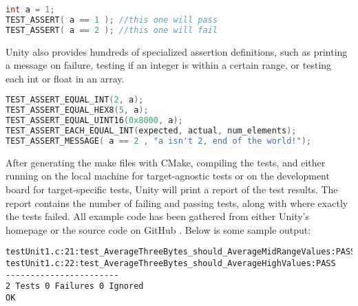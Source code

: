 \begin{lstlisting}[language=C, caption=Unity Basic Assertion Example
\cite{unity-homepage}]
int a = 1;
TEST_ASSERT( a == 1 ); //this one will pass
TEST_ASSERT( a == 2 ); //this one will fail
\end{lstlisting}

Unity also provides hundreds of specialized assertion definitions, such as
printing a message on failure, testing if an integer is within a certain range,
or testing each int or float in an array.

\begin{lstlisting}[language=c, caption=More advanced Unity Assertions
\cite{unity-github}]
TEST_ASSERT_EQUAL_INT(2, a);
TEST_ASSERT_EQUAL_HEX8(5, a);
TEST_ASSERT_EQUAL_UINT16(0x8000, a);
TEST_ASSERT_EACH_EQUAL_INT(expected, actual, num_elements);
TEST_ASSERT_MESSAGE( a == 2 , "a isn't 2, end of the world!");
\end{lstlisting}

After generating the make files with CMake, compiling the tests, and either
running on the local machine for target-agnostic tests or on the development
board for target-specific tests, Unity will print a report of the test results.
The report contains the number of failing and passing tests, along with where
exactly the tests failed. All example code has been gathered from either Unity's
homepage \cite{unity-homepage} or the source code on GitHub \cite{unity-github}.
Below is some sample output:

\begin{lstlisting}[caption=Example Unity Test Report Output \cite{unity-homepage}]
testUnit1.c:21:test_AverageThreeBytes_should_AverageMidRangeValues:PASS
testUnit1.c:22:test_AverageThreeBytes_should_AverageHighValues:PASS
-----------------------
2 Tests 0 Failures 0 Ignored
OK
\end{lstlisting}
